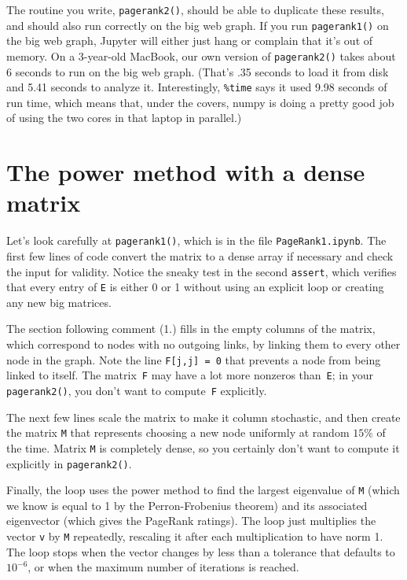 \documentclass[11pt]{article}
\begin{document}
The routine you write, {\tt pagerank2()}, should be able to duplicate
these results, and should also run correctly on the big web graph.
If you run {\tt pagerank1()} on the big web graph, 
Jupyter will either just hang or complain that it's out of memory.
On a 3-year-old MacBook, our own version of {\tt pagerank2()} 
takes about 6 seconds to run on the big web graph.
(That's .35 seconds to load it from disk and 5.41 seconds to analyze it.
Interestingly, {\tt \%time} says it used 9.98 seconds of run time, 
which means that, under the covers, numpy is doing a pretty good job of
using the two cores in that laptop in parallel.)

\section{The power method with a dense matrix}

Let's look carefully at {\tt pagerank1()},
which is in the file {\tt PageRank1.ipynb}.
The first few lines of code convert the matrix to a dense
array if necessary and check the input for validity.
Notice the sneaky test in the second {\tt assert}, which
verifies that every entry of {\tt E} is either 0 or 1 without
using an explicit loop or creating any new big matrices.

The section following comment (1.) fills in the empty
columns of the matrix, which correspond to nodes with
no outgoing links, by linking them to every other
node in the graph. 
Note the line {\tt F[j,j] = 0} that prevents a node
from being linked to itself.
The matrix~{\tt F} may have a lot more nonzeros than~{\tt E}; 
in your {\tt pagerank2()}, you don't want to compute~{\tt F} explicitly.

The next few lines scale the matrix to make it column stochastic, 
and then create the matrix {\tt M} that represents choosing
a new node uniformly at random $15\%$ of the time. 
Matrix {\tt M} is completely dense, so you certainly 
don't want to compute it explicitly in {\tt pagerank2()}.

Finally, the loop uses the power method to find the largest
eigenvalue of {\tt M} (which we know is equal to 1
by the Perron-Frobenius theorem) and its associated
eigenvector (which gives the PageRank ratings).
The loop just multiplies the vector {\tt v} by {\tt M} repeatedly, 
rescaling it after each multiplication to have norm 1.  
The loop stops when the vector changes by less than a
tolerance that defaults to $10^{-6}$, or when the maximum
number of iterations is reached.
\end{document}
